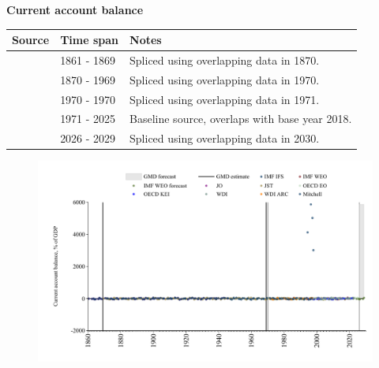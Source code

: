 \documentclass[12pt,a4paper,landscape]{article}
\begin{document}
\begin{adjustbox}{max totalsize={\paperwidth}{\paperheight},center}
\begin{minipage}[t][\textheight][t]{\textwidth}
\vspace*{0.5cm}
{}
\begin{center}
{\Large\bfseries Current account balance}
\end{center}
\vspace{0.5cm}
\begin{table}[H]
\centering
\small
\begin{tabular}{|l|l|l|}
\hline
\textbf{Source} & \textbf{Time span} & \textbf{Notes} \\
\hline
\rowcolor{white}\cite{JO}& 1861 - 1869 &Spliced using overlapping data in 1870. \\
\rowcolor{lightgray}\cite{JST}& 1870 - 1969 &Spliced using overlapping data in 1970. \\
\rowcolor{white}\cite{WDI}& 1970 - 1970 &Spliced using overlapping data in 1971. \\
\rowcolor{lightgray}\cite{OECD_EO}& 1971 - 2025 &Baseline source, overlaps with base year 2018. \\
\rowcolor{white}\cite{IMF_WEO_forecast}& 2026 - 2029 &Spliced using overlapping data in 2030. \\
\hline
\end{tabular}
\end{table}
\begin{figure}[H]
\centering
\includegraphics[width=\textwidth,height=0.6\textheight,keepaspectratio]{graphs/ITA_CA_GDP.pdf}
\end{figure}
\end{minipage}
\end{adjustbox}
\end{document}
